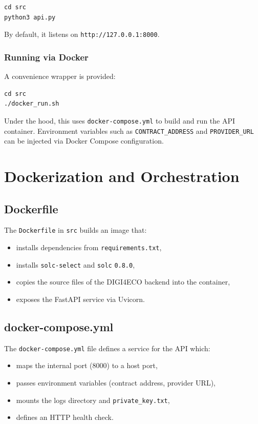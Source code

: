 \documentclass[11pt,a4paper]{article}
\begin{document}
\begin{lstlisting}
cd src
python3 api.py
\end{lstlisting}

By default, it listens on \texttt{http://127.0.0.1:8000}.

\subsubsection{Running via Docker}

A convenience wrapper is provided:

\begin{lstlisting}
cd src
./docker_run.sh
\end{lstlisting}

Under the hood, this uses \texttt{docker-compose.yml} to build and run the API container. Environment variables such as \texttt{CONTRACT\_ADDRESS} and \texttt{PROVIDER\_URL} can be injected via Docker Compose configuration.

\section{Dockerization and Orchestration}

\subsection{Dockerfile}

The \texttt{Dockerfile} in \texttt{src} builds an image that:

\begin{itemize}[noitemsep]
  \item installs dependencies from \texttt{requirements.txt},
  \item installs \texttt{solc-select} and \texttt{solc} \texttt{0.8.0},
  \item copies the source files of the DIGI4ECO backend into the container,
  \item exposes the FastAPI service via Uvicorn.
\end{itemize}

\subsection{docker-compose.yml}

The \texttt{docker-compose.yml} file defines a service for the API which:

\begin{itemize}[noitemsep]
  \item maps the internal port (8000) to a host port,
  \item passes environment variables (contract address, provider URL),
  \item mounts the logs directory and \texttt{private\_key.txt},
  \item defines an HTTP health check.
\end{itemize}
\end{document}

